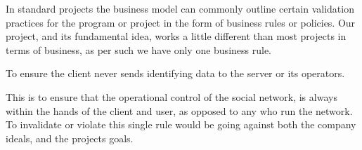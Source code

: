In standard projects the business model can commonly outline certain validation practices for the program or project in the form of business rules or policies. Our project, and its fundamental idea, works a little different than most projects in terms of business, as per such we have only one business rule.

To ensure the client never sends identifying data to the server or its operators.

This is to ensure that the operational control of the social network, is always within the hands of the client and user, as opposed to any who run the network. To invalidate or violate this single rule would be going against both the company ideals, and the projects goals.
